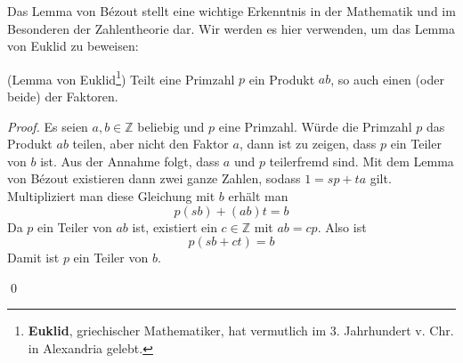 Das Lemma von Bézout stellt eine wichtige Erkenntnis in der Mathematik und im Besonderen der Zahlentheorie dar. Wir werden es hier verwenden, um das Lemma von Euklid zu beweisen:

\begin{lemma}{(Lemma von Euklid\footnote{\textbf{Euklid}, griechischer Mathematiker, hat vermutlich im 3. Jahrhundert v. Chr. in Alexandria gelebt.})}
Teilt eine Primzahl $p$ ein Produkt $ab$, so auch einen (oder beide) der Faktoren.
\end{lemma}
\begin{proof}
Es seien $a,b \in \mathbb{Z}$ beliebig und $p$ eine Primzahl. Würde die Primzahl $p$ das Produkt $ab$ teilen, aber nicht den Faktor $a$, dann ist zu zeigen, dass $p$ ein Teiler von $b$ ist. Aus der Annahme folgt, dass $a$ und $p$ teilerfremd sind. Mit dem Lemma von Bézout existieren dann zwei ganze Zahlen, sodass $1=sp+ta$ gilt. Multipliziert man diese Gleichung mit $b$ erhält man
\[
p(sb)+(ab)t=b
\]
Da $p$ ein Teiler von $ab$ ist, existiert ein $c\in \mathbb{Z}$ mit $ab=cp$. Also ist
\[
p(sb+ct) = b
\]
Damit ist $p$ ein Teiler von $b$.

\qed
\end{proof}

